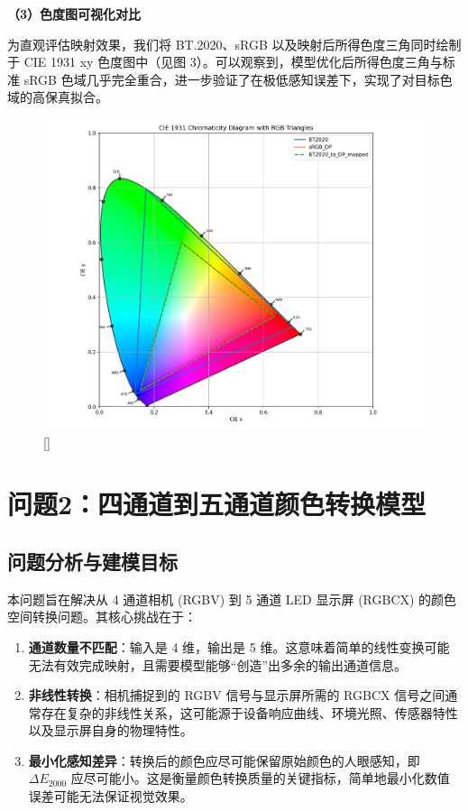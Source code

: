 \noindent\textbf{（3）色度图可视化对比}

为直观评估映射效果，我们将 BT.2020、sRGB 以及映射后所得色度三角同时绘制于 CIE 1931 xy 色度图中（见图 3）。可以观察到，模型优化后所得色度三角与标准 sRGB 色域几乎完全重合，进一步验证了在极低感知误差下，实现了对目标色域的高保真拟合。
\begin{figure}[h]
\centering
{}
\includegraphics[width=0.8\columnwidth]{figures/色度.png}
\bicaption[色度图]{}[]{}
\vspace{-10pt}
\label{figure3: 色度图}
\end{figure}


\section[\hspace{-2pt}问题2：四通道到五通道颜色转换模型]{{\heiti{} \hspace{-8pt}问题2：四通道到五通道颜色转换模型}}\label{section3: 问题2：四通道到五通道颜色转换模型}
\subsection[\hspace{-2pt}问题分析与建模目标]{{\heiti{} \hspace{-8pt}问题分析与建模目标}}\label{section2: 问题分析与建模目标}

本问题旨在解决从 4 通道相机 (RGBV) 到 5 通道 LED 显示屏 (RGBCX) 的颜色空间转换问题。其核心挑战在于：
\begin{enumerate}
    \item \textbf{通道数量不匹配}：输入是 4 维，输出是 5 维。这意味着简单的线性变换可能无法有效完成映射，且需要模型能够“创造”出多余的输出通道信息。
    \item \textbf{非线性转换}：相机捕捉到的 RGBV 信号与显示屏所需的 RGBCX 信号之间通常存在复杂的非线性关系，这可能源于设备响应曲线、环境光照、传感器特性以及显示屏自身的物理特性。
    \item \textbf{最小化感知差异}：转换后的颜色应尽可能保留原始颜色的人眼感知，即 $\Delta E_{2000}$ 应尽可能小。这是衡量颜色转换质量的关键指标，简单地最小化数值误差可能无法保证视觉效果。
\end{enumerate}

